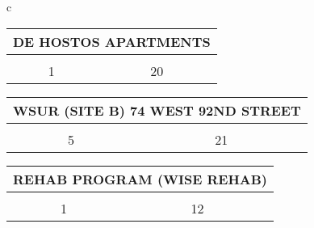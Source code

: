 \begin{table}[H]
\begin{tabular}{c}
                        \begin{tabular}{cc}
                        \multicolumn{2}{l}{DE HOSTOS APARTMENTS}                                                                                                                                   \\ \hline
                        \rowcolor{\ccorange} 
                        \multicolumn{1}{|c|}{\cellcolor{\ccorange}{\color[HTML]{FFFFFF} Building}} & \multicolumn{1}{c|}{\cellcolor{\ccorange}{\color[HTML]{FFFFFF} Total Repairs}} \\ \hline
                        \multicolumn{1}{|c|}{1}                                                        & \multicolumn{1}{c|}{20}                                                             \\ \hline
\end{tabular}
                        \begin{tabular}{cc}
                        \multicolumn{2}{l}{WSUR (SITE B) 74 WEST 92ND STREET}                                                                                                                                   \\ \hline
                        \rowcolor{\ccorange} 
                        \multicolumn{1}{|c|}{\cellcolor{\ccorange}{\color[HTML]{FFFFFF} Building}} & \multicolumn{1}{c|}{\cellcolor{\ccorange}{\color[HTML]{FFFFFF} Total Repairs}} \\ \hline
                        \multicolumn{1}{|c|}{5}                                                        & \multicolumn{1}{c|}{21}                                                             \\ \hline
\end{tabular}
                        \begin{tabular}{cc}
                        \multicolumn{2}{l}{REHAB PROGRAM (WISE REHAB)}                                                                                                                                   \\ \hline
                        \rowcolor{\ccorange} 
                        \multicolumn{1}{|c|}{\cellcolor{\ccorange}{\color[HTML]{FFFFFF} Building}} & \multicolumn{1}{c|}{\cellcolor{\ccorange}{\color[HTML]{FFFFFF} Total Repairs}} \\ \hline
                        \multicolumn{1}{|c|}{1}                                                        & \multicolumn{1}{c|}{12}                                                             \\ \hline

\end{tabular}
\end{tabular}
\end{table}
